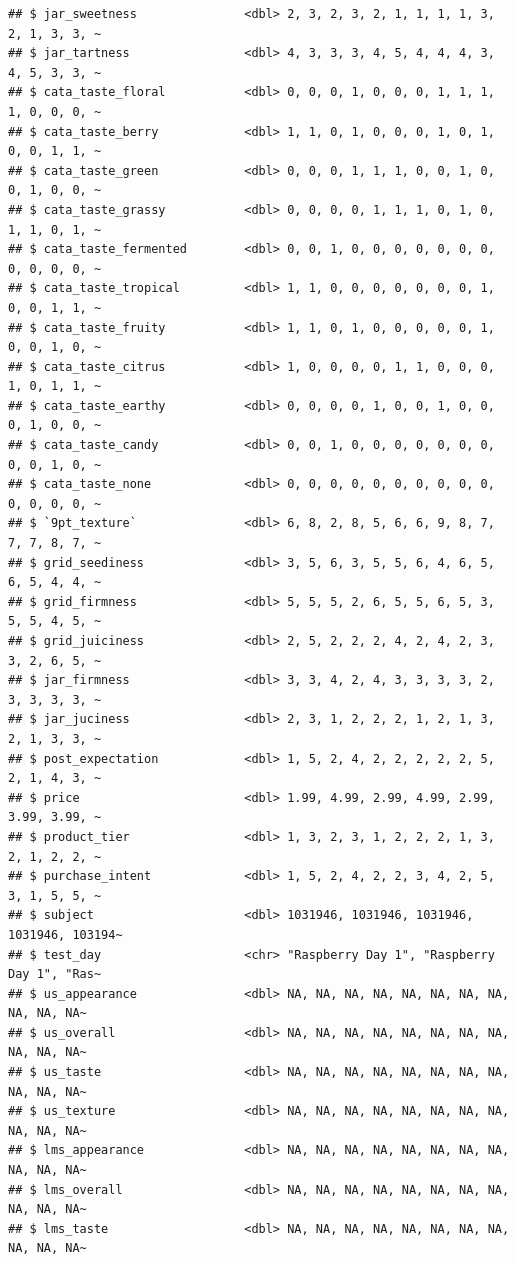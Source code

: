 \documentclass[
]{book}
\begin{document}
\begin{verbatim}
## $ jar_sweetness               <dbl> 2, 3, 2, 3, 2, 1, 1, 1, 1, 3, 2, 1, 3, 3, ~
## $ jar_tartness                <dbl> 4, 3, 3, 3, 4, 5, 4, 4, 4, 3, 4, 5, 3, 3, ~
## $ cata_taste_floral           <dbl> 0, 0, 0, 1, 0, 0, 0, 1, 1, 1, 1, 0, 0, 0, ~
## $ cata_taste_berry            <dbl> 1, 1, 0, 1, 0, 0, 0, 1, 0, 1, 0, 0, 1, 1, ~
## $ cata_taste_green            <dbl> 0, 0, 0, 1, 1, 1, 0, 0, 1, 0, 0, 1, 0, 0, ~
## $ cata_taste_grassy           <dbl> 0, 0, 0, 0, 1, 1, 1, 0, 1, 0, 1, 1, 0, 1, ~
## $ cata_taste_fermented        <dbl> 0, 0, 1, 0, 0, 0, 0, 0, 0, 0, 0, 0, 0, 0, ~
## $ cata_taste_tropical         <dbl> 1, 1, 0, 0, 0, 0, 0, 0, 0, 1, 0, 0, 1, 1, ~
## $ cata_taste_fruity           <dbl> 1, 1, 0, 1, 0, 0, 0, 0, 0, 1, 0, 0, 1, 0, ~
## $ cata_taste_citrus           <dbl> 1, 0, 0, 0, 0, 1, 1, 0, 0, 0, 1, 0, 1, 1, ~
## $ cata_taste_earthy           <dbl> 0, 0, 0, 0, 1, 0, 0, 1, 0, 0, 0, 1, 0, 0, ~
## $ cata_taste_candy            <dbl> 0, 0, 1, 0, 0, 0, 0, 0, 0, 0, 0, 0, 1, 0, ~
## $ cata_taste_none             <dbl> 0, 0, 0, 0, 0, 0, 0, 0, 0, 0, 0, 0, 0, 0, ~
## $ `9pt_texture`               <dbl> 6, 8, 2, 8, 5, 6, 6, 9, 8, 7, 7, 7, 8, 7, ~
## $ grid_seediness              <dbl> 3, 5, 6, 3, 5, 5, 6, 4, 6, 5, 6, 5, 4, 4, ~
## $ grid_firmness               <dbl> 5, 5, 5, 2, 6, 5, 5, 6, 5, 3, 5, 5, 4, 5, ~
## $ grid_juiciness              <dbl> 2, 5, 2, 2, 2, 4, 2, 4, 2, 3, 3, 2, 6, 5, ~
## $ jar_firmness                <dbl> 3, 3, 4, 2, 4, 3, 3, 3, 3, 2, 3, 3, 3, 3, ~
## $ jar_juciness                <dbl> 2, 3, 1, 2, 2, 2, 1, 2, 1, 3, 2, 1, 3, 3, ~
## $ post_expectation            <dbl> 1, 5, 2, 4, 2, 2, 2, 2, 2, 5, 2, 1, 4, 3, ~
## $ price                       <dbl> 1.99, 4.99, 2.99, 4.99, 2.99, 3.99, 3.99, ~
## $ product_tier                <dbl> 1, 3, 2, 3, 1, 2, 2, 2, 1, 3, 2, 1, 2, 2, ~
## $ purchase_intent             <dbl> 1, 5, 2, 4, 2, 2, 3, 4, 2, 5, 3, 1, 5, 5, ~
## $ subject                     <dbl> 1031946, 1031946, 1031946, 1031946, 103194~
## $ test_day                    <chr> "Raspberry Day 1", "Raspberry Day 1", "Ras~
## $ us_appearance               <dbl> NA, NA, NA, NA, NA, NA, NA, NA, NA, NA, NA~
## $ us_overall                  <dbl> NA, NA, NA, NA, NA, NA, NA, NA, NA, NA, NA~
## $ us_taste                    <dbl> NA, NA, NA, NA, NA, NA, NA, NA, NA, NA, NA~
## $ us_texture                  <dbl> NA, NA, NA, NA, NA, NA, NA, NA, NA, NA, NA~
## $ lms_appearance              <dbl> NA, NA, NA, NA, NA, NA, NA, NA, NA, NA, NA~
## $ lms_overall                 <dbl> NA, NA, NA, NA, NA, NA, NA, NA, NA, NA, NA~
## $ lms_taste                   <dbl> NA, NA, NA, NA, NA, NA, NA, NA, NA, NA, NA~

\end{verbatim}
\end{document}
